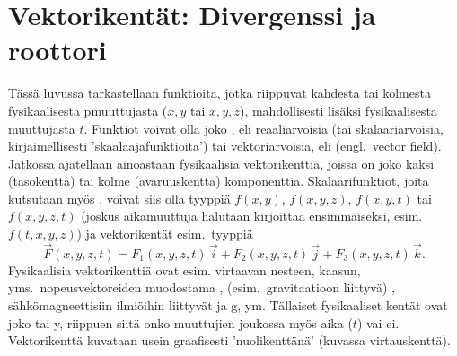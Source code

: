 \section{Vektorikentät: Divergenssi ja roottori} \label{divergenssi ja roottori}
\alku
{}

Tässä luvussa tarkastellaan funktioita, jotka riippuvat kahdesta tai kolmesta fysikaalisesta
pmuuttujasta ($x,y$ tai $x,y,z$), mahdollisesti lisäksi fysikaalisesta
muuttujasta $t$. Funktiot voivat olla joko , eli
reaaliarvoisia (tai skalaariarvoisia, kirjaimellisesti 'skaalaajafunktioita') tai
vektoriarvoisia, eli
 (engl.\ vector field). Jatkossa ajatellaan ainoastaan fysikaalisia
vektorikenttiä, joissa on joko kaksi (tasokenttä) tai kolme (avaruuskenttä) komponenttia.
Skalaarifunktiot, joita
%
kutsutaan myös , voivat siis olla tyyppiä $f(x,y)$, $f(x,y,z)$,
$f(x,y,t)$ tai $f(x,y,z,t)$ (joskus aikamuuttuja halutaan kirjoittaa ensimmäiseksi,
esim.\ $f(t,x,y,z)$) ja vektorikentät esim.\ tyyppiä
\[ 
\vec F(x,y,z,t) = F_1(x,y,z,t)\,\vec i + F_2(x,y,z,t)\,\vec j + F_3(x,y,z,t)\,\vec k. 
\]
Fysikaalisia vektorikenttiä ovat esim. virtaavan nesteen, kaasun, yms.\ nopeusvektoreiden 
muodostama , (esim.\ gravitaatioon liittyvä) , 
sähkömagneettisiin ilmiöihin liittyvät  ja g, ym.
Tällaiset fysikaaliset kentät ovat joko  tai y, riippuen
siitä onko muuttujien joukossa myös aika ($t$) vai ei. Vektorikenttä kuvataan usein graafisesti
'nuolikenttänä' (kuvassa virtauskenttä).

